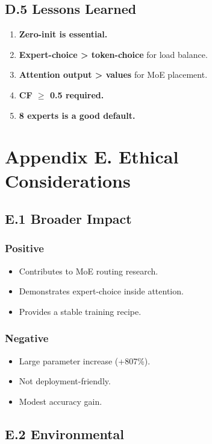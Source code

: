\subsection{D.5 Lessons Learned}

\begin{enumerate}
\item \textbf{Zero-init is essential.}
\item \textbf{Expert-choice \textgreater{} token-choice} for load balance.
\item \textbf{Attention output \textgreater{} values} for MoE placement.
\item \textbf{CF $\ge$ 0.5 required.}
\item \textbf{8 experts is a good default.}

\end{enumerate}


\section{Appendix E. Ethical Considerations}

\subsection{E.1 Broader Impact}

\subsubsection{Positive}
\begin{itemize}
\item Contributes to MoE routing research.
\item Demonstrates expert-choice inside attention.
\item Provides a stable training recipe.

\end{itemize}
\subsubsection{Negative}
\begin{itemize}
\item Large parameter increase (+807\%).
\item Not deployment-friendly.
\item Modest accuracy gain.

\end{itemize}
\subsection{E.2 Environmental}

